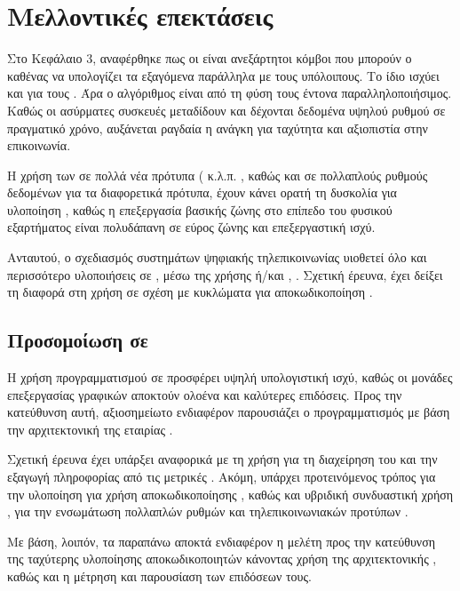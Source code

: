\chapter{Mελλοντικές επεκτάσεις}
Στο Κεφάλαιο 3, αναφέρθηκε πως οι  είναι ανεξάρτητοι κόμβοι που μπορούν ο καθένας να υπολογίζει τα εξαγόμενα  παράλληλα με τους υπόλοιπους. Το ίδιο ισχύει και για τους . Άρα ο αλγόριθμος  είναι από τη φύση τους έντονα παραλληλοποιήσιμος. Καθώς οι ασύρματες συσκευές μεταδίδουν και δέχονται δεδομένα υψηλού ρυθμού σε πραγματικό χρόνο, αυξάνεται ραγδαία η ανάγκη για ταχύτητα και αξιοπιστία στην επικοινωνία.

Η χρήση των  σε πολλά νέα πρότυπα (  κ.λ.π. \cite{falcao2011massively}, καθώς και σε πολλαπλούς ρυθμούς δεδομένων για τα διαφορετικά πρότυπα, έχουν κάνει ορατή τη δυσκολία για υλοποίηση , καθώς η επεξεργασία βασικής ζώνης στο επίπεδο του φυσικού εξαρτήματος είναι πολυδάπανη σε εύρος ζώνης και επεξεργαστική ισχύ. 

Αντ\textquotesingle αυτού, ο σχεδιασμός συστημάτων ψηφιακής τηλεπικοινωνίας υιοθετεί όλο και περισσότερο υλοποιήσεις σε , μέσω της χρήσης  ή/και  \cite{park2011parallel}, \cite{abburi2011scalable}. Σχετική έρευνα, έχει δείξει τη διαφορά στη χρήση  σε σχέση με κυκλώματα  για  αποκωδικοποίηση \cite{falcao2009gpus}.

\section{Προσομοίωση σε }

Η χρήση προγραμματισμού σε  προσφέρει υψηλή υπολογιστική ισχύ, καθώς οι μονάδες επεξεργασίας γραφικών αποκτούν ολοένα και καλύτερες επιδόσεις. Προς την κατεύθυνση αυτή, αξιοσημείωτο ενδιαφέρον παρουσιάζει ο προγραμματισμός με βάση την αρχιτεκτονική  της εταιρίας .

Σχετική έρευνα έχει υπάρξει αναφορικά με τη χρήση  για τη διαχείρηση του  και την εξαγωγή πληροφορίας από τις μετρικές  \cite{falcao2009parallel}. Ακόμη, υπάρχει προτεινόμενος τρόπος για την υλοποίηση  για χρήση  αποκωδικοποίησης \cite{falcao2011massively}, καθώς και υβριδική συνδυαστική χρήση , για την ενσωμάτωση πολλαπλών ρυθμών και τηλεπικοινωνιακών προτύπων \cite{park2011parallel}.

Με βάση, λοιπόν, τα παραπάνω αποκτά ενδιαφέρον η μελέτη προς την κατεύθυνση της ταχύτερης υλοποίησης  αποκωδικοποιητών κάνοντας χρήση της αρχιτεκτονικής , καθώς και η μέτρηση και παρουσίαση των επιδόσεων τους.

